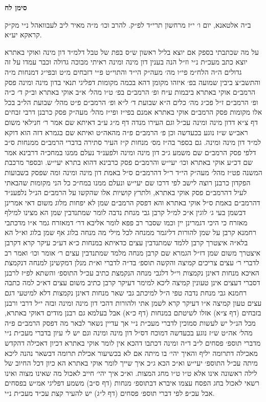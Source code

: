 \documentclass[12pt, openany]{book}
\newcommand{\chapname}{}
\newcommand{\newchap}[1]{
	\addcontentsline{toc}{chapter}{#1}
	\renewcommand{\chapname}{#1}
		\begin{center}
			\textbf{%
\fontsize{16pt}{16pt}\selectfont
				#1}
		\end{center}
}
\begin{document}
\newchap{סימן לח}
\begin{multicols}{2}
ב״ה אלטאנא, יום ו׳ י״ז מרחשון תרי״ד לפ״ק. להרב וכו׳ מ״ה מאיר ליב לעבוואהל נ״י מק״ק קראקא יע״א.\\\vspace{0pt}

על מה שכתבתי בספק אם יוצא בליל ראשון ש״ס בפת של טבל דלמ״ד דון מינה ואוקי באתרא יוצא כתב מעכ״ת נ״י וז״ל הנה בענין דון מינה ומינה ראיתי מבוכה גדולה וכבר עמדו על זה גדולים ה״ה הלח״מ פי״ו מה׳ מעה״ק הי״ד והתוי״ט פ״י דזבחים מ״ט ובפי״ג דמנחות מ״ה והתשב״צ ביבין שמועה בפ׳ איזהו מקומן דהא בכמה מקומות דפליגי תנאי בדון מינה ומינה פסק הרמב״ם אוקי באתרא ביבמות ע״ח ופ׳ הרמב״ם בפ׳ ט״ו מהל׳ א״ב אוקי באתרא וב״ק ד׳ כ״ה ופ׳ הרמב״ם ז״ל פכ״ג מה׳ כלים ה״א שבועת ד׳ ל״א ופ׳ הרמב״ם פ״ט מהל׳ שבועת הל״ב בכל אלו מקומות פסק הרמב״ם אוקי באתרא אמנם בפי״ז ופי״ז מהל׳ מעה״ק פסק כרבנן דרבי זבחים דף צ״א דדון מינה ומינה עכ״ל וגם העירו מנדה דף מ״ג ע״ב דאיתא שם אמר ר׳ חנילאי משום ראב״ש ש״ז נוגע בכעדשה וכן פ׳ הרמב״ם פ״ה מהאה״ט ואיתא שם בגמרא דזה הוא דוקא למ״ד דון מינה ומינה. גם בספר בה״ז מס׳ מנחות ק״ז העיר סתירה בדברי הרמב״ם ממנחות ס״ב דלפי פסק הרמב״ם שם משמע ג״כ דון מינה ומינה ולפענ״ד נעלם ממנו במחכ״ה דרבינא אמר שם דכ״ע אוקי באתרא וכו׳ יעי״ש והרמב״ם פסק כרבינא דהוא בתרא יעי״ש. ובספר מרכבת המשנה פט״ז מהל׳ מעה״ק הי״ד ר״ל דהרמב״ם ס״ל באמת דון מינה ומינה ומה שפסק בשבועות הפקדון כרבנן רוצה לישב לפי דרכו שם יעי״ש ונעלם ממנו במח״כ כל הני מקומות שהבאתי לעיל דהרמב״ם פסק אוקי באתרא, ולתרץ קושיות אלו שהקשו על הרמב״ם הנ״ל נלפענ״ד דהרמב״ם באמת ס״ל אוקי באתרא והא דפסק הרמב״ם שמן לא יפחות מלוג משום דאי אמרינן דבשמן בעי ג׳ לוגין א״כ למ״ל קרבן גבי מנחת נדבה לומר שמתנדבין שמן הא מצינו למילף מאזרח כי היכי דגמרינן יין וכמו שסבר רב פפא לומר אליבא דר׳ דמאזרח גמר א״ו מדכתבי רחמנא קרבן על שמן להורות דליגמר ממנחה לכל מילי מה מנחה בלוג אף שמן בלוג וא״ל הא בלא״ה איצטרך קרבן ללמד שמתנדבין עצים כדאיתא במנחות כ״א דע״כ עיקר קרא דקרבן איצטרך משום שמן דז״ל הגמרא שם קרבן מנחה מלמד שמתנדבין עצים ר׳ אומר וכו׳ ואמר רב לדברי ר׳ עצים צריכים קמיצה והקשה תוספ׳ בד״ה לדברי וא״ת מנלן דמקשינן למנחה דנקמצת האיכא מנחות דאינן נקמצות וי״ל דלגבי מנחה הנקמצת כתיב עכ״ל התוספ׳ והשתא לפ״ז לרבנן דסברי דעצים אינן טעונין קמיצה ליכא למימר דעיקר קרבן כתיב משום עצים דא״כ למה כתבה רחמנא גבי מנחת נדבה טפי ה״ל למיכתב גבי שאר מנחות דאינן נקמצות דלא למיטעי דגם עצים טעון קמיצה א״ו דעיקר קרא לשמן אתי ולהורות דהכי דון מינה ומינה ובזה י״ל דרבי ורבנן בזבחים (דף צ״א) אזלו לשיטתם במנחות (דף כ״א) אבל בעלמא גם רבנן מודים דאוקי באתרא, מכל הנ״ל יש לעשות סמוכין לדברי מעכ״ת נ״י אך עדיין נשאר לבאר מה דפסק הרמב״ם פ״ה מהל׳ אה״ט ש״ז נוגע בכעדשה דמוכח דס״ל דון מינה ומינה וגם יש לי עיון בדברי מעכ״ת נ״י מדברי תוספ׳ פסחים ל״ב ד״ה ומינה דכתבו דהכא אין לומר אוקי באתרא דכיון דאכילה דהקדש מאכילה דתרומה יליף והאיך יהי׳ בו מיתה אם לא בכשיעור אכילת תרומה דבשאר נהנה ליכא מיתה עכ״ל התוספ׳ יעי״ש וא״כ הכא ג״כ איך שייך לומר אוקי באתרא הא כיון דכל החיוב של לילה ראשונה אינו אלא ט״ו ט״ו מחג המצות. וא״כ איך יהי׳ חייב לאכול מה שאינו מצוה ואינו רשאי לאכול בחג הפסח עצמו איברא דבתוספ׳ מנחות (דף ס״ב) משמע דפליגי אמ״ש בפסחים אבל עכ״פ לפי דברי תוספ׳ פסחים (דף ל״ג) יש להעיר קצת עכ״ד מעכ״ת נ״י.\\\vspace{0pt}


\end{multicols}
\end{document}
